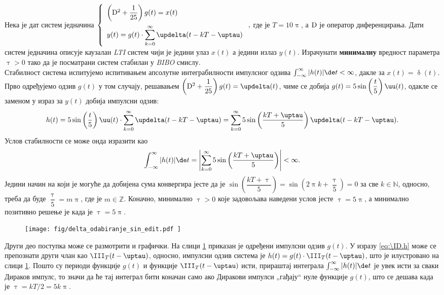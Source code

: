 \PID 
Нека је  
дат систем једначина
$
\displaystyle
\left\lbrace
\begin{array}{l}
\left({\rm D}^2 + \dfrac{1}{25} \right) g(t) = x(t) 
\\[4mm] \displaystyle
y(t) = g(t) \cdot \sum_{k=0}^{\infty} \updelta(t - kT - \uptau)
\end{array} 
\right.,$
где је $T = 10\uppi$, а ${\rm D}$ је оператор 
диференцирања. Дати систем једначина описује
каузалан \textit{LTI} систем чији је једини улаз 
$x(t)$ а једини излаз $y(t)$.
Израчунати \textbf{минималну} вредност параметра $\uptau > 0$ тако да је посматрани систем
стабилан у \textit{BIBO} смислу.
\\[2mm]

\RESENJE  Стабилност система испитујемо испитивањем апсолутне интеграбилности импулсног одзива
$\int_{-\infty}^{\infty} |h(t)| \de t < \infty$, дакле за $x(t) = \updelta(t)$. Прво одређујемо одзив $g(t)$ у том случају,
решавањем $\left({\rm D}^2 + \dfrac{1}{25} \right) g(t) = \updelta(t)$, чиме се добија 
$g(t) =  5 \sin\left(\dfrac{t}{5}\right) \uu(t)$, одакле се заменом у израз за $y(t)$ добија импулсни одзив: 
\begin{equation}
    h(t) = 5 \sin\left(\dfrac{t}{5}\right) \uu(t) \cdot \sum_{k=0}^{\infty} \updelta(t - kT - \uptau) 
         = \sum_{k=0}^{\infty}  5 \sin\left(\dfrac{kT + \uptau}{5}\right) \updelta(t - kT - \uptau). \label{eq:\ID.h}
\end{equation}
Услов стабилности се може онда изразити као
\begin{equation}
    \int_{-\infty}^{\infty} |h(t)| \de t = \left| \sum_{k=0}^{\infty}  5 \sin\left(\dfrac{kT + \uptau}{5}\right)\right| < \infty.  
\end{equation}
Једини начин на који је могуће да добијена сума конвергира јесте да је
$\sin\left(\dfrac{kT + \uptau}{5}\right) =  \sin\left(2\uppi k + \dfrac{\uptau}{5}\right) = 0$ за све $k \in \mathbb{N}$,
односно, треба да буде $\dfrac{\uptau}{5} = m\uppi$, где је $m \in \mathbb{Z}$. Коначно, минимално $\uptau>0$ које задовољава наведени
услов јесте $\uptau = 5\uppi$, а минимално позитивно решење је када је $\uptau = 5\uppi$.

\begin{figure}[!b]
    \centering
    \texttt{[image: fig/delta\_odabiranje\_sin\_edit.pdf ]}
    \caption{}
    \label{fig:\ID.ideja}
\end{figure}

Други део поступка може се размотрити и графички. На слици \ref{fig:\ID.ideja} приказан је одређени импулсни одзив 
$g(t)$. У изразу \eqref{eq:\ID.h} може се препознати други члан као $\III_T(t - \uptau)$, односно, импулсни одзив система
је $h(t) = g(t) \cdot \III_T(t - \uptau)$, што је илустровано на слици \ref{fig:\ID.ideja}. Пошто су периоди функције $g(t)$ и функције
$\III_T(t - \uptau)$ исти, прираштај интеграла $\int_{-\infty}^{\infty} |h(t)| \de t$ је увек исти за сваки Дираков импулс, 
то значи да ће тај интеграл бити коначан само ако Диракови импулси „гађају“ нуле функције $g(t)$, што се дешава када је
$\uptau = kT/2 = 5k\uppi$.
